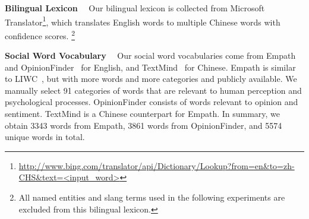 \textbf{Bilingual Lexicon}~~
\label{sec:blpre}
Our bilingual lexicon is collected from Microsoft Translator\footnote{\scriptsize{\url{http://www.bing.com/translator/api/Dictionary/Lookup?from=en&to=zh-CHS&text=<input_word>}}}, which translates English words to multiple
Chinese words with confidence scores. 
\footnote{All named entities and slang terms used
	in the following experiments are excluded from this bilingual lexicon.}



\textbf{Social Word Vocabulary}~~
\label{sec:sv}
Our social word vocabularies come from 
Empath~\cite{fast2016empath} and OpinionFinder~\cite{choi2005identifying} 
for English, and TextMind~\cite{gao2013developing} for Chinese.
Empath is similar to LIWC~\cite{pennebaker2001linguistic},
but with more words and more categories and publicly available. 
We manually select 91 categories of words that are 
relevant to human perception and psychological processes. 
OpinionFinder consists of words relevant to opinion and sentiment. 
TextMind is a Chinese counterpart for Empath.
%
In summary, we obtain 3343 words from Empath, 3861 words from OpinionFinder, 
and 5574 unique words in total. 




